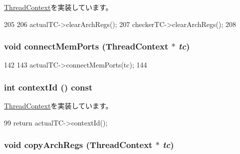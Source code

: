 \hyperlink{classThreadContext_ae0375c0a094eeb6fe8f73db4393d4ceb}{ThreadContext}を実装しています。


\begin{DoxyCode}
205     {
206         actualTC->clearArchRegs();
207         checkerTC->clearArchRegs();
208     }
\end{DoxyCode}
\hypertarget{classCheckerThreadContext_a3506df24394f8f7b32263dd01979d64a}{
\subsubsection[{connectMemPorts}]{\setlength{\rightskip}{0pt plus 5cm}void connectMemPorts ({\bf ThreadContext} $\ast$ {\em tc})}}
\label{classCheckerThreadContext_a3506df24394f8f7b32263dd01979d64a}



\begin{DoxyCode}
142     {
143         actualTC->connectMemPorts(tc);
144     }
\end{DoxyCode}
\hypertarget{classCheckerThreadContext_a651d5d14e7a4e95ebe6d7f5b8ee5a107}{
\subsubsection[{contextId}]{\setlength{\rightskip}{0pt plus 5cm}int contextId () const}}
\label{classCheckerThreadContext_a651d5d14e7a4e95ebe6d7f5b8ee5a107}


\hyperlink{classThreadContext_a5a3ce3f955d2ec16ac6f2aa21e42f3a0}{ThreadContext}を実装しています。


\begin{DoxyCode}
99 { return actualTC->contextId(); }
\end{DoxyCode}
\hypertarget{classCheckerThreadContext_a01b372f805c92c90e6148b76d23d6236}{
\subsubsection[{copyArchRegs}]{\setlength{\rightskip}{0pt plus 5cm}void copyArchRegs ({\bf ThreadContext} $\ast$ {\em tc})}}
\label{classCheckerThreadContext_a01b372f805c92c90e6148b76d23d6236}



